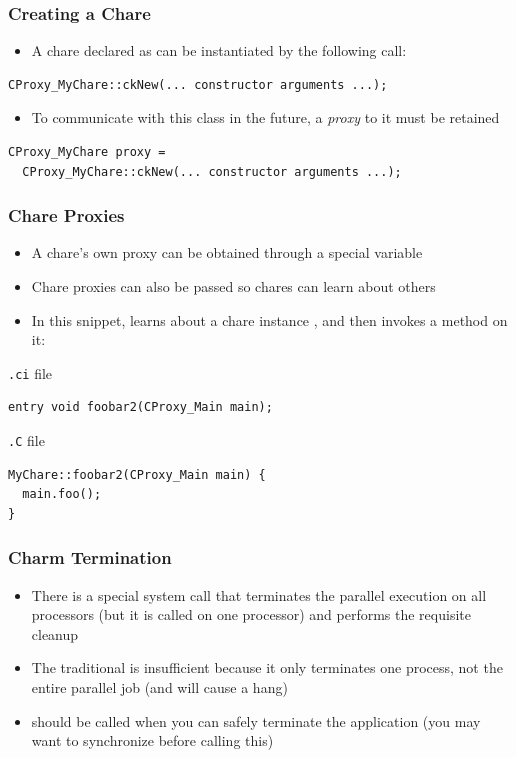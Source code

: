\begin{frame}[fragile]
  \frametitle{Creating a Chare}
  \begin{itemize}
    \item A chare declared as  can be
      instantiated by the following call:
  \end{itemize}
\begin{lstlisting}
CProxy_MyChare::ckNew(... constructor arguments ...);
\end{lstlisting}
  \begin{itemize}
  \item To communicate with this class in the future, a \textit{proxy} to it
    must be retained
  \end{itemize}
\begin{lstlisting}
CProxy_MyChare proxy = 
  CProxy_MyChare::ckNew(... constructor arguments ...);
\end{lstlisting}
\end{frame}

\begin{frame}[fragile]
  \frametitle{Chare Proxies}
  \begin{itemize}
  \item A chare's own proxy can be obtained through a special variable
  \item Chare proxies can also be passed so chares can learn about others
  \item In this snippet,  learns about a chare instance
    , and then invokes a method on it:
  \end{itemize}
\texttt{.ci} file
\begin{lstlisting}
entry void foobar2(CProxy_Main main);
\end{lstlisting}
\texttt{.C} file
\begin{lstlisting}
MyChare::foobar2(CProxy_Main main) {
  main.foo();
}
\end{lstlisting}
\end{frame}

\begin{frame}[fragile]
   \frametitle{Charm Termination}
   \begin{itemize}
   \item There is a special system call  that terminates the
     parallel execution on all processors (but it is called on one processor)
     and performs the requisite cleanup
   \item The traditional  is insufficient because it only
     terminates one process, not the entire parallel job (and will cause a
     hang)
   \item {} should be called when you can safely terminate the
     application (you may want to synchronize before calling this)
   \end{itemize}
\end{frame}

